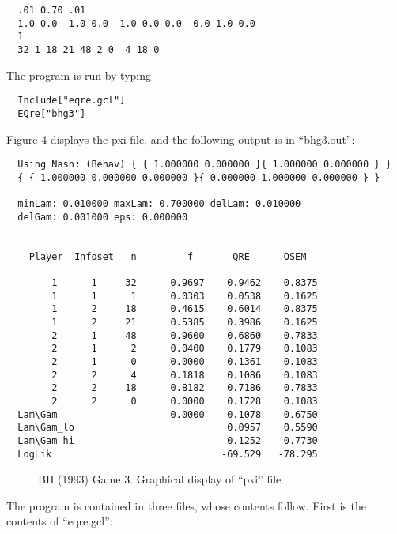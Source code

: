 \begin{verbatim}
  .01 0.70 .01
  1.0 0.0  1.0 0.0  1.0 0.0 0.0  0.0 1.0 0.0 
  1
  32 1 18 21 48 2 0  4 18 0
\end{verbatim}

\noindent
The program is run by typing 

\begin{verbatim}
  Include["eqre.gcl"]
  EQre["bhg3"]
\end{verbatim}

\noindent
Figure 4 displays the pxi file, and the following output is in
``bhg3.out'':

\begin{verbatim}
  Using Nash: (Behav) { { 1.000000 0.000000 }{ 1.000000 0.000000 } }
  { { 1.000000 0.000000 0.000000 }{ 0.000000 1.000000 0.000000 } }

  minLam: 0.010000 maxLam: 0.700000 delLam: 0.010000
  delGam: 0.001000 eps: 0.000000


    Player  Infoset   n         f       QRE      OSEM

        1      1     32      0.9697    0.9462    0.8375
        1      1      1      0.0303    0.0538    0.1625
        1      2     18      0.4615    0.6014    0.8375
        1      2     21      0.5385    0.3986    0.1625
        2      1     48      0.9600    0.6860    0.7833
        2      1      2      0.0400    0.1779    0.1083
        2      1      0      0.0000    0.1361    0.1083
        2      2      4      0.1818    0.1086    0.1083
        2      2     18      0.8182    0.7186    0.7833
        2      2      0      0.0000    0.1728    0.1083
  Lam\Gam                    0.0000    0.1078    0.6750
  Lam\Gam_lo                           0.0957    0.5590
  Lam\Gam_hi                           0.1252    0.7730
  LogLik                              -69.529   -78.295
\end{verbatim}


\newpage
\begin{figure}[htp]
\centerline{}
\vspace{.5in}
\centerline{}
\caption{BH (1993) Game 3. Graphical display of ``pxi'' file }
\end{figure}

\noindent
The program is contained in three files, whose contents follow.  First
is the contents of ``eqre.gcl'':

